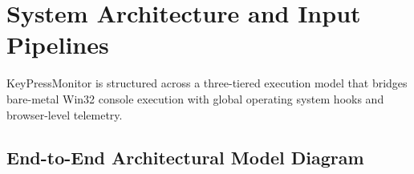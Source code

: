 \documentclass[11pt,a4paper]{article}
\begin{document}
\section{System Architecture and Input Pipelines}

KeyPressMonitor is structured across a three-tiered execution model that bridges bare-metal Win32 console execution with global operating system hooks and browser-level telemetry.

\subsection{End-to-End Architectural Model Diagram}
\end{document}
